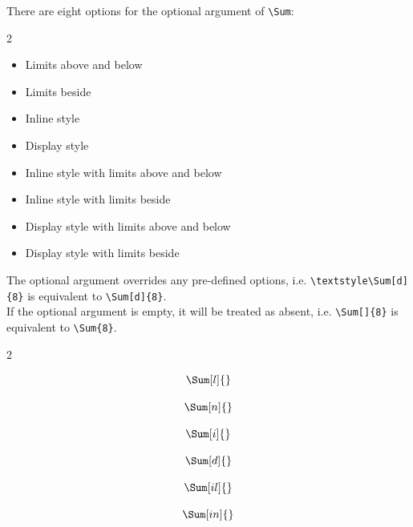 \documentclass{article}
\begin{document}
{There are eight options for the optional argument of \verb!\Sum!:
\vspace*{-10pt}
\begin{multicols}{2}
\begin{itemize}[leftmargin=0.5in,labelsep=0.3in]
    \item[\texttt{l}] Limits above and below
    \item[\texttt{n}] Limits beside
    \item[\texttt{i}] Inline style
    \item[\texttt{d}] Display style
    \item[\texttt{il}] Inline style with limits above and below
    \item[\texttt{in}] Inline style with limits beside
    \item[\texttt{dl}] Display style with limits above and below
    \item[\texttt{dn}] Display style with limits beside
\end{itemize}
\end{multicols}

The optional argument overrides any pre-defined options, i.e. \verb!\textstyle\Sum[d]{8}! is equivalent to \verb!\Sum[d]{8}!.\\

If the optional argument is empty, it will be treated as absent, i.e. \verb!\Sum[]{8}! is equivalent to \verb!\Sum{8}!.

\begin{multicols}{2}
\begin{verbbox}
$$\Sum[l]{}$$
\end{verbbox}

\begin{verbbox}
$$\Sum[n]{}$$
\end{verbbox}

\begin{verbbox}
$$\Sum[i]{}$$
\end{verbbox}

\begin{verbbox}
$$\Sum[d]{}$$
\end{verbbox}
\begin{verbbox}
$$\Sum[il]{}$$
\end{verbbox}

\begin{verbbox}
$$\Sum[in]{}$$
\end{verbbox}


\end{multicols}}
\end{document}
